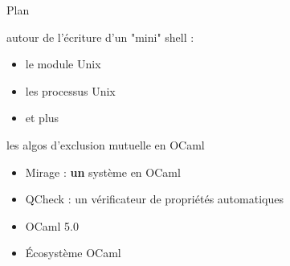 \begin{frame}{Plan}
   
    autour de l'écriture d'un "mini" shell :
    \begin{itemize}[label=]
        \item le module Unix
        \item les processus Unix  
        \item et plus
    \end{itemize}   
    
     les algos d'exclusion mutuelle en OCaml

     \begin{itemize}[label=$-$]
        \item Mirage : \textbf{un} système en OCaml
        \item QCheck : un vérificateur de propriétés automatiques
        \item OCaml 5.0
        \item Écosystème OCaml
    \end{itemize}   
\end{frame}